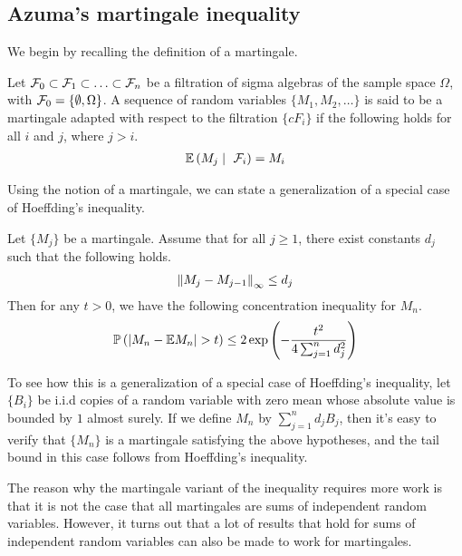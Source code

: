 \documentclass[11pt]{article}
\begin{document}
\subsection{Azuma's martingale inequality}
\label{sec:azum-mart-ineq}

We begin by recalling the definition of a martingale.
\begin{definition}[Martingale]
  Let $\mathcal{F}_0 \subset \mathcal{F}_1 \subset \ldots \subset \mathcal{F}_n$ be a filtration of sigma algebras of the sample space $\Omega$, with $\mathcal{F}_0 = \{\emptyset, \Omega\}$.
  A sequence of random variables $\{M_1, M_2, \ldots\}$ is said to be a martingale adapted with respect to the filtration $\{ cF_i\}$ if the following holds for all $i$ and $j$, where $j > i$.
  \begin{align*}
    \mathbb{E}\left( M_j \mid\ \mathcal{F}_i \right) = M_i
  \end{align*}
\end{definition}

Using the notion of a martingale, we can state a generalization of a special case of Hoeffding's inequality.

\begin{theorem}
  \label{thm:azuma-martingale}
  Let $\{M_j\}$ be a martingale. Assume that for all $j \geq 1$, there exist constants $d_j$ such that the following holds.
  \begin{align*}
    \left\lVert M_j - M_{j-1}\right\rVert_{\infty} \leq d_j
  \end{align*}
  Then for any $t > 0$, we have the following concentration inequality for $M_n$.
  \begin{align*}
    \mathbb{P}\left( \left| M_n - \mathbb{E} M_n \right| > t \right)
    \leq 2 \exp\left( - \frac{t^2}{4\sum_{j=1}^n d_j^2} \right)
  \end{align*}
\end{theorem}
To see how this is a generalization of a special case of Hoeffding's inequality, let $\{B_i\}$ be i.i.d copies of a random variable with zero mean whose absolute value is bounded by $1$ almost surely.
If we define $M_n$ by $\sum_{j=1}^n d_jB_j$, then it's easy to verify that $\{M_n\}$ is a martingale satisfying the above hypotheses, and the tail bound in this case follows from Hoeffding's inequality.

The reason why the martingale variant of the inequality requires more work is that it is not the case that all martingales are sums of independent random variables.
However, it turns out that a lot of results that hold for sums of independent random variables can also be made to work for martingales.
\end{document}
